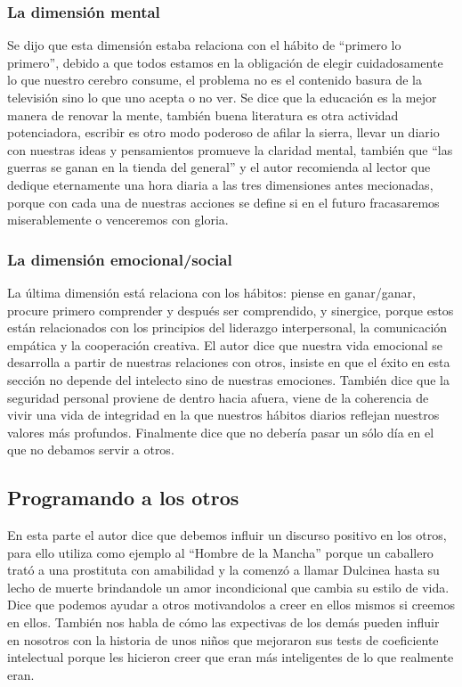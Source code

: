 \documentclass[onecolumn]{article} %
\begin{document}
	\subsubsection{La dimensión mental}
	
	Se dijo que esta dimensión estaba relaciona con el hábito de ``primero lo primero'', debido a que todos estamos en la obligación de elegir cuidadosamente lo que nuestro cerebro consume, el problema no es el contenido basura de la televisión sino lo que uno acepta o no ver. Se dice que la educación es la mejor manera de renovar la mente, también buena literatura es otra actividad potenciadora, escribir es otro modo poderoso de afilar la sierra, llevar un diario con nuestras ideas y pensamientos promueve la claridad mental, también que ``las guerras se ganan en la tienda del general'' y el autor recomienda al lector que dedique eternamente una hora diaria a las tres dimensiones antes mecionadas, porque con cada una de nuestras acciones se define si en el futuro fracasaremos miserablemente o venceremos con gloria.
	
	\subsubsection{La dimensión emocional/social}
	
	La última dimensión está relaciona con los hábitos: piense en ganar/ganar, procure primero comprender y después ser comprendido, y sinergice, porque estos están relacionados con los principios del liderazgo interpersonal, la comunicación empática y la cooperación creativa. El autor dice que nuestra vida emocional se desarrolla a partir de nuestras relaciones con otros, insiste en que el éxito en esta sección no depende del intelecto sino de nuestras emociones. También dice que la seguridad personal proviene de dentro hacia afuera, viene de la coherencia de vivir una vida de integridad en la que nuestros hábitos diarios reflejan nuestros valores más profundos. Finalmente dice que no debería pasar un sólo día en el que no debamos servir a otros.
	
	\subsection{Programando a los otros}
	
	En esta parte el autor dice que debemos influir un discurso positivo en los otros, para ello utiliza como ejemplo al ``Hombre de la Mancha'' porque un caballero trató a una prostituta con amabilidad y la comenzó a llamar Dulcinea hasta su lecho de muerte brindandole un amor incondicional que cambia su estilo de vida. Dice que podemos ayudar a otros motivandolos a creer en ellos mismos si creemos en ellos. También nos habla de cómo las expectivas de los demás pueden influir en nosotros con la historia de unos niños que mejoraron sus tests de coeficiente intelectual porque les hicieron creer que eran más inteligentes de lo que realmente eran.
	
\end{document}
